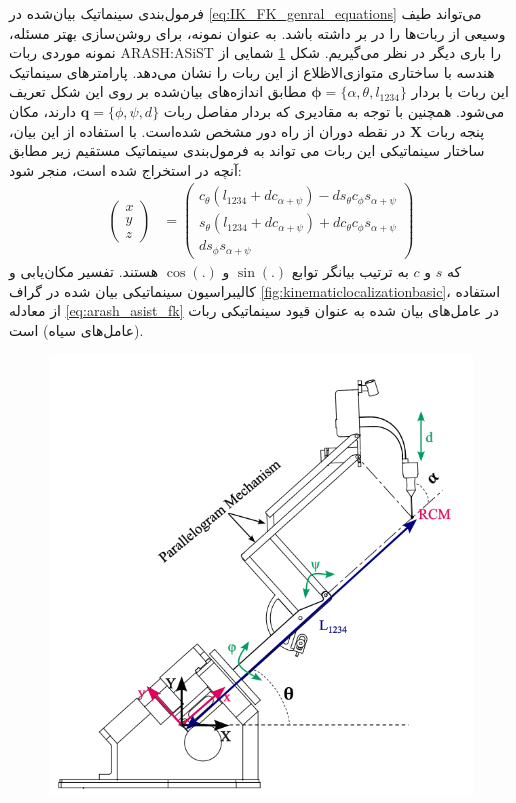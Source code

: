 فرمول‌بندی سینماتیک بیان‌شده در 
\ref{eq:IK_FK_genral_equations}
می‌تواند طیف وسیعی از ربات‌ها را در بر داشته باشد. به عنوان نمونه، برای روشن‌سازی بهتر مسئله، نمونه موردی ربات
ARASH:ASiST
را باری دیگر در نظر می‌گیریم. شکل
\ref{fig:arashasiststructure}
شمایی از هندسه با ساختاری متوازی‌الاظلاع از این ربات را نشان می‌دهد. پارامترهای سینماتیک این ربات با بردار
$\boldsymbol{\phi} = \{ \alpha, \theta , l_{1234} \} $
مطابق اندازه‌های بیان‌شده بر روی این شکل تعریف می‌شود. همچنین با توجه به مقادیری که بردار مفاصل ربات 
$ \boldsymbol{q}=\{ \phi, \psi, d \} $
دارند، مکان پنجه ربات
$\boldsymbol{X}$
در نقطه دوران از راه دور مشخص شده‌است. با استفاده از این بیان، ساختار سینماتیکی این ربات می تواند به فرمول‌بندی سینماتیک  مستقیم زیر مطابق آنچه در
\cite{hassani2021kinematic}
استخراج شده است، منجر شود:
\begin{equation} \label{eq:arash_asist_fk}
		\begin{aligned}
			\left( \begin{array}{c}
				x \\
				y \\
				z 
			\end{array} \right)
			&=
			\left( \begin{array}{c}
				c_{\theta}(l_{1234} + dc_{\alpha + \psi}) - ds_{\theta}c_{\phi}s_{\alpha + \psi} \\
				s_{\theta}(l_{1234} + dc_{\alpha + \psi}) + d c_{\theta}c_{\phi}s_{\alpha + \psi} \\
				ds_{\phi} s_{\alpha + \psi}
			\end{array} \right)
		\end{aligned}
\end{equation}
که $s$ و $c$ به ترتیب بیانگر توابع 
$\sin(.)$
و
$\cos(.)$
هستند. تفسیر مکان‌یابی و کالیبراسیون سینماتیکی بیان شده در گراف
\ref{fig:kinematiclocalizationbasic}،
استفاده از معادله
\ref{eq:arash_asist_fk}
در عامل‌های بیان شده به عنوان قیود سینماتیکی ربات (عامل‌های سیاه) است. 

\begin{figure}
	\centering
	\includegraphics[width=0.5\linewidth]{img/ARASH_ASIST_Structure}
	\caption{}
	\label{fig:arashasiststructure}
\end{figure}

